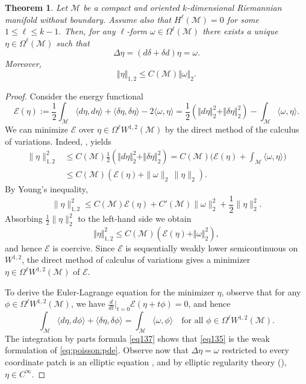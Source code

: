 \documentclass[intlimits,12pt,reqno]{amsart}
\newcommand{\cM}{\mathcal M}
\numberwithin{equation}{section}
\newtheorem{theorem}{Theorem}[section]
\theoremstyle{definition}
\newcommand{\brac}[1]{\left ( #1 \right )}
\begin{document}
\begin{theorem}
\label{th:poisson}
Let $\cM$ be a compact and oriented $k$-dimensional Riemannian manifold without boundary. 
Assume also that $H^\ell(\mathcal{M})=0$ for some $1 \leq \ell \leq k-1$.
Then, for any $\ell$-form $\omega \in\Omega^\ell(\cM)$ there exists a unique $\eta \in\Omega^\ell(\cM)$ such that 
\begin{equation}
\label{eq:poisson:pde}
\Delta \eta=(d\delta+\delta d)\eta = \omega. 
\end{equation}
Moreover,
\begin{equation}
\label{eq145}
\Vert\eta\Vert_{1,2}\leq C(\cM)\Vert\omega\Vert_2.
\end{equation}
\end{theorem}
\begin{proof}
Consider the energy functional
\[
\mathcal{E}(\eta) 
:= 
\frac{1}{2}\int_\cM\langle d\eta,d\eta\rangle+\langle\delta\eta,\delta\eta\rangle-2\langle\omega,\eta\rangle
=
\frac{1}{2}\brac{\Vert d\eta\Vert_2^2+\Vert\delta\eta\Vert_2^2}-\int_\cM \langle\omega,\eta\rangle.
\]
We can minimize $\mathcal{E}$ over $\eta \in\Omega^\ell W^{1,2}(\cM)$ by the direct method of the calculus of variations. Indeed, , yields
\[
\begin{split}
\|\eta\|_{1,2}^2  
&\leq 
C(\mathcal{M}) \frac{1}{2}\brac{\Vert d\eta\Vert_2^2+\Vert\delta\eta\Vert_2^2}=
C(\cM)\bigg(\mathcal{E}(\eta)+\int_\cM\langle\omega,\eta\rangle\bigg)\\
&\leq 
C(\cM)\brac{\mathcal{E}(\eta) + \|\omega\|_{2}\, \|\eta\|_{2}}. 
\end{split}
\]
By Young's inequality, 
\[
 \|\eta\|_{1,2}^2  \leq C(\mathcal{M})\mathcal{E}(\eta) + C'(\mathcal{M}) \|\omega\|_{2}^2 +\frac{1}{2} \|\eta\|_{2}^2. 
\]
Absorbing $\frac{1}{2}\|\eta\|_{2}^2$ to the left-hand side we obtain 
\begin{equation}
\label{eq136}
\Vert\eta\Vert_{1,2}^2\leq C(\cM)(\mathcal{E}(\eta)+\Vert\omega\Vert_2^2),
\end{equation}
and hence $\mathcal{E}$ is coercive. 
Since $\mathcal{E}$ is sequentially weakly lower semicontinuous on $W^{1,2}$, the direct method of calculus of variations gives a minimizer $\eta \in \Omega^\ell W^{1,2}(\cM)$ of $\mathcal{E}$. 

To derive the Euler-Lagrange equation for the minimizer $\eta$, observe that for any $\phi\in\Omega^\ell W^{1,2}(\cM)$, we have
$\frac{d}{dt}\big|_{t=0}\mathcal{E}(\eta+t\phi)=0$, and hence
\begin{equation}
\label{eq135}
\int_\cM \langle d\eta,d\phi\rangle+\langle\delta\eta,\delta\phi\rangle=\int_\cM\langle\omega,\phi\rangle
\quad
\text{for all } \phi\in \Omega^\ell W^{1,2}(\cM).
\end{equation}
The integration by parts formula \eqref{eq137}
shows that \eqref{eq135} is the weak formulation of \eqref{eq:poisson:pde}.
Observe now that $\Delta\eta=\omega$ restricted to every coordinate patch is an elliptic equation \cite[Section~6.35]{warner}, and by elliptic regularity theory (\cite[Theorem 6.30]{warner}), $\eta \in C^\infty$.


\end{proof}
\end{document}
